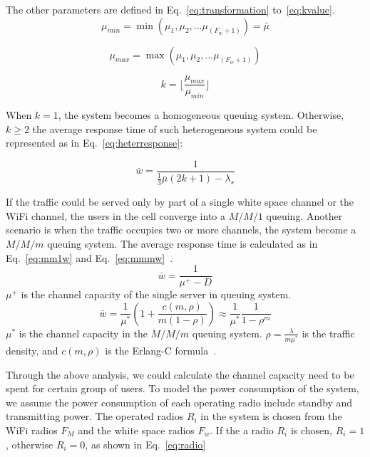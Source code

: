 The other parameters are defined in Eq.~\ref{eq:transformation} to~\ref{eq:kvalue}.
\begin{equation}
\label{eq:transformation}
\mu_{min}=\min{(\mu_1,\mu_2,...\mu_{(F_w+1)})} = \bar{\mu}
\end{equation}

\begin{equation}
\mu_{max}=\max{(\mu_1,\mu_2,...\mu_{(F_w+1)})} 
\end{equation}

\begin{equation}
\label{eq:kvalue}
k= \lfloor\frac{\mu_{max}}{\mu_{min}} \rfloor
\end{equation}

When $k=1$, the system becomes a homogeneous queuing system. Otherwise,   
$k\ge2$ the average response time of such heterogeneous system could be represented as in Eq.~\ref{eq:heterresponse}\cite{yu2008transformation}:

\begin{equation}
\label{eq:heterresponse}
\bar{w}=\frac{1}{\frac{1}{3}\bar{\mu}(2k+1)-\lambda_s}
\end{equation}

If the traffic could be served only by part of a single white space channel or the WiFi channel, the users in the cell 
converge into a $M/M/1$ queuing. Another scenario is when the traffic occupies two or more channels, the system become 
a $M/M/m$ queuing system. The average response time is calculated as in Eq.~\ref{eq:mm1w} and Eq.~\ref{eq:mmmw}~\cite{gelenbe1998introduction}.
\begin{equation}
\label{eq:mm1w}
\bar{w}=\frac{1}{\mu^+-D}
\end{equation}
$\mu^+$ is the channel capacity of the single server in queuing system.
\begin{equation}
\label{eq:mmmw}
\bar{w} = \frac{1}{\mu^*}(1+\frac{c(m,\rho)}{m(1-\rho)})\approx \frac{1}{\mu^*}\frac{1}{1-\rho^m}
\end{equation}
$\mu^*$ is the channel capacity in the $M/M/m$ queuing system.
$\rho=\frac{\lambda}{m\mu^*}$ is the traffic density, and $c(m,\rho)$ is the Erlang-C formula~\cite{gelenbe1998introduction}.

Through the above analysis, we could calculate the channel capacity need to be spent for certain group of users. 
To model the power consumption of the system, we assume the power consumption of each operating radio include 
standby and transmitting power.
The operated radios $R_i$ in the system is chosen from the WiFi radios $F_M$ and the white space radios $F_w$. 
If the a radio $R_i$ is chosen, $R_i = 1$, otherwise $R_i = 0$, as shown in Eq.~\ref{eq:radio}

